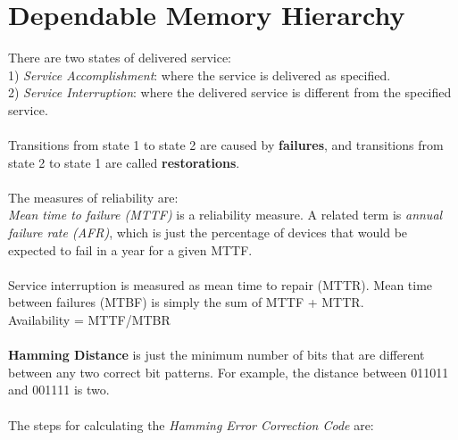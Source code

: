 \documentclass[letterpaper,c12pt]{article}
\begin{document}
\section{Dependable Memory Hierarchy}
There are two states of delivered service:\\
1) \textit{Service Accomplishment}: where the service is delivered as specified.\\
2) \textit{Service Interruption}: where the delivered service is different from the specified service.\\\\
Transitions from state 1 to state 2 are caused by \textbf{failures}, and transitions from state 2 to state 1 are called \textbf{restorations}.\\\\
The measures of reliability are:\\
\textit{Mean time to failure (MTTF)} is a reliability measure. A related term is \textit{annual failure rate (AFR)}, which is just the percentage of devices that would be expected to fail in a year for a given MTTF.\\\\
Service interruption is measured as mean time to repair (MTTR). Mean time between failures (MTBF) is simply the sum of MTTF + MTTR.\\
Availability = MTTF/MTBR\\\\
\textbf{Hamming Distance} is just the minimum number of bits that are different between any two correct bit patterns. For example, the distance between 011011 and 001111 is two.\\\\
The steps for calculating the \textit{Hamming Error Correction Code} are:
\end{document}
